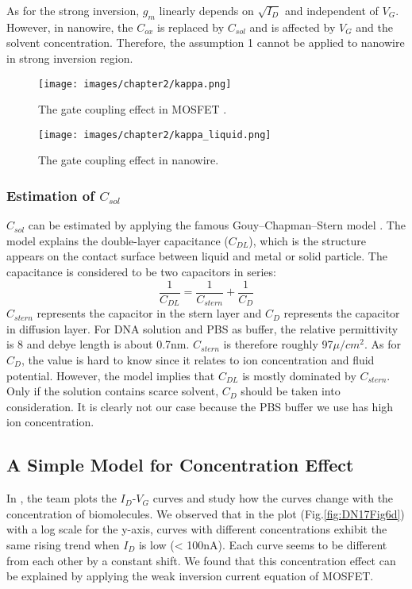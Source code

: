As for the strong inversion, $g_m$ linearly depends on $\sqrt{I_D}$ and independent of $V_G$.
However, in nanowire, the $C_{ox}$ is replaced by $C_{sol}$ and is affected by $V_G$ and the solvent concentration.
Therefore, the assumption 1 cannot be applied to nanowire in strong inversion region.

\begin{figure}[bt!h]
    \centering
    \texttt{[image: images/chapter2/kappa.png]}
    \caption{The gate coupling effect in MOSFET \cite{bookOfUltra}.}
    \label{fig:gateCouple}
\end{figure}
\begin{figure}[bt!h]
    \centering
    \texttt{[image: images/chapter2/kappa\_liquid.png]}
    \caption{The gate coupling effect in nanowire.}
    \label{fig:gateCouple_NW}
\end{figure}


\subsubsection*{Estimation of $C_{sol}$}
$C_{sol}$ can be estimated by applying the famous Gouy–Chapman–Stern model \cite{bookOfElecMethod}.
The model explains the double-layer capacitance ($C_{DL}$), which is the structure appears on the contact surface between liquid and metal or solid particle.
The capacitance is considered to be two capacitors in series:
\begin{equation}
    \frac{1}{C_{DL}} = \frac{1}{C_{stern}} + \frac{1}{C_D}
\end{equation}
$C_{stern}$ represents the capacitor in the stern layer and $C_D$ represents the capacitor in diffusion layer.
For DNA solution and PBS as buffer, the relative permittivity is 8 \cite{dnaepisilon} and debye length is about 0.7nm.
$C_{stern}$ is therefore roughly 97$\mu/cm^2$.
As for $C_D$, the value is hard to know since it relates to ion concentration and fluid potential.
However, the model implies that $C_{DL}$ is mostly dominated by $C_{stern}$.
Only if the solution contains scarce solvent, $C_D$ should be taken into consideration.
It is clearly not our case because the PBS buffer we use has high ion concentration.

\subsection{A Simple Model for Concentration Effect}
In \cite{DN17}, the team plots the $I_D$-$V_G$ curves and study how the curves change with the concentration of biomolecules.
We observed that in the plot (Fig.\ref{fig:DN17Fig6d}) with a log scale for the y-axis, curves with different concentrations exhibit the same rising trend when $I_D$ is low (< 100nA).
Each curve seems to be different from each other by a constant shift.
We found that this concentration effect can be explained by applying the weak inversion current equation of MOSFET.


